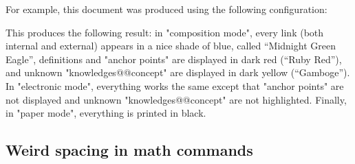 \documentclass{article}
\begin{document}
For example, this document was produced using the following configuration:
\begin{spverbatim}

\end{spverbatim}

This produces the following result: in "composition mode",
every link (both internal and external) appears in 
a nice shade of blue, called ``Midnight Green Eagle'', definitions and "anchor 
points" are displayed in dark red (``Ruby Red''), and unknown 
"knowledges@@concept" are displayed in dark yellow (``Gamboge'').
In "electronic mode", everything works the same except that
"anchor points" are not displayed and unknown "knowledges@@concept" are 
not highlighted. Finally, in "paper mode", everything is printed in black.

\subsection{Weird spacing in math commands}
\end{document}

